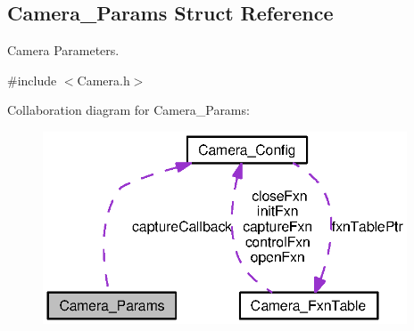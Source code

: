 \subsection{Camera\+\_\+\+Params Struct Reference}
\label{struct_camera___params}


Camera Parameters.  




{\ttfamily \#include $<$Camera.\+h$>$}



Collaboration diagram for Camera\+\_\+\+Params\+:
\nopagebreak
\begin{figure}[H]
\begin{center}
\leavevmode
\includegraphics[width=306pt]{struct_camera___params__coll__graph}
\end{center}
\end{figure}
